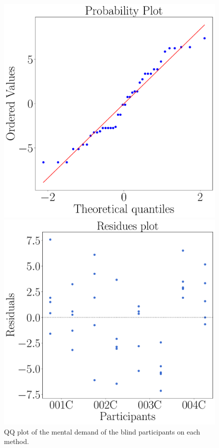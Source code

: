 \begin{figure}[!htb]
    \centering
    \begin{minipage}{0.45\textwidth}
        \centering
        \includegraphics[width = \textwidth]{Resultados/Nasa/Figuras/pdf/qqplot_md_avg_two_way_blind.pdf}
        \caption{QQ plot of the mental demand of the blind participants on each method.}
        \label{fig:qqplot_md_avg_two_way_blind}
    \end{minipage}
    \begin{minipage}{0.075\textwidth}
        \hfill
    \end{minipage}
    \begin{minipage}{0.45\textwidth}
        \centering
        \includegraphics[width = \textwidth]{Resultados/Nasa/Figuras/pdf/residplot_md_avg_two_way_blind.pdf}

\end{minipage}
\end{figure}
